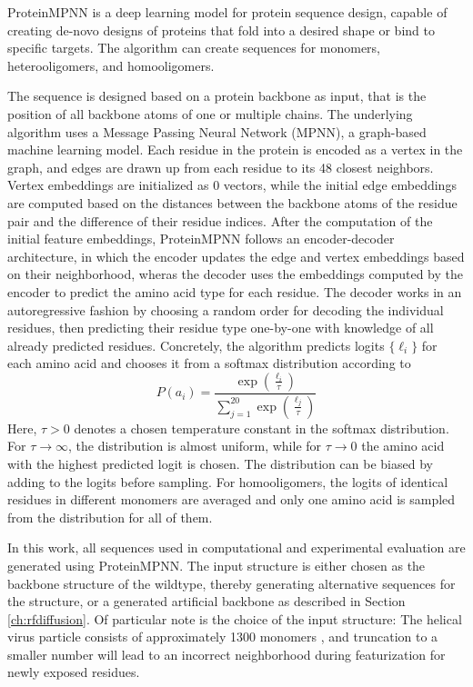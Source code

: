 ProteinMPNN \cite{PMPNN2022} is a deep learning model for protein sequence design, capable of creating de-novo designs of proteins that fold into a desired shape or bind to specific targets. The algorithm can create sequences for monomers, heterooligomers, and homooligomers. 

The sequence is designed based on a protein backbone as input, that is the position of all backbone atoms of one or multiple chains. The underlying algorithm uses a Message Passing Neural Network (MPNN), a graph-based machine learning model. Each residue in the protein is encoded as a vertex in the graph, and edges are drawn up from each residue to its 48 closest neighbors. Vertex embeddings are initialized as 0 vectors, while the initial edge embeddings are computed based on the distances between the backbone atoms of the residue pair and the difference of their residue indices. After the computation of the initial feature embeddings, ProteinMPNN follows an encoder-decoder architecture, in which the encoder updates the edge and vertex embeddings based on their neighborhood, wheras the decoder uses the embeddings computed by the encoder to predict the amino acid type for each residue. The decoder works in an autoregressive fashion by choosing a random order for decoding the individual residues, then predicting their residue type one-by-one with knowledge of all already predicted residues. Concretely, the algorithm predicts logits $\{\ell_i\}$ for each amino acid and chooses it from a softmax distribution according to
$$P(a_i) = \frac{\exp\left( \frac{\ell_i}{\tau} \right)}{\sum_{j=1}^{20} \exp\left( \frac{\ell_j}{\tau} \right)}$$
Here, $\tau>0$ denotes a chosen temperature constant in the softmax distribution. For $\tau\rightarrow\infty$, the distribution is almost uniform, while for $\tau\rightarrow 0$ the amino acid with the highest predicted logit is chosen. The distribution can be biased by adding to the logits before sampling. For homooligomers, the logits of identical residues in different monomers are averaged and only one amino acid is sampled from the distribution for all of them. 

In this work, all sequences used in computational and experimental evaluation are generated using ProteinMPNN. The input structure is either chosen as the backbone structure of the wildtype, thereby generating alternative sequences for the structure, or a generated artificial backbone as described in Section \ref{ch:rfdiffusion}. Of particular note is the choice of the input structure: The helical virus particle consists of approximately 1300 monomers \cite{Grinzato2020}, and truncation to a smaller number will lead to an incorrect neighborhood during featurization for newly exposed residues. 

